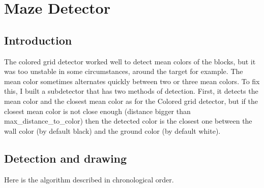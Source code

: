 \section{Maze Detector}
\label{sec:md}


\subsection{Introduction}
\label{sec:md:intro}

The colored grid detector worked well to detect mean colors of the blocks, 
but it was too unstable in some circumstances, around the target for 
example. The mean color sometimes alternates quickly between two or 
three mean colors. To fix this, I built a subdetector that has two 
methods of detection. First, it detects the mean color and the closest 
mean color as for the Colored grid detector, but if the closest mean 
color is not close enough (distance bigger than max\_distance\_to\_color) 
then the detected color is the closest one between the wall color (by 
default black) and the ground color (by default white).

\subsection{Detection and drawing}
\label{sec:md:algo}
Here is the algorithm described in chronological order.


